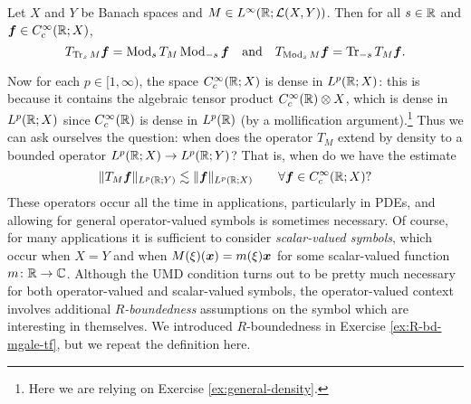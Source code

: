 \begin{prop}
  Let $X$ and $Y$ be Banach spaces and $M \in L^\infty(\mathbb{R};\mathcal{L}(X,Y))$.
  Then for all $s \in \mathbb{R}$ and $\bm{f} \in C^{\infty}_{c}(\mathbb{R};X)$,
  \begin{equation*}
    T_{\operatorname{Tr}_{s} M} \bm{f} = \operatorname{Mod}_{s} T_{M} \operatorname{Mod}_{-s} \bm{f} \quad \text{and} \quad
    T_{\operatorname{Mod}_{s} M} \bm{f} = \operatorname{Tr}_{-s} T_{M} \bm{f}. 
  \end{equation*}
\end{prop}

Now for each $p \in [1,\infty)$, the space $C_{c}^\infty(\mathbb{R};X)$ is dense in $L^p(\mathbb{R};X)$: this is because it contains the algebraic tensor product $C_{c}^\infty(\mathbb{R}) \otimes X$, which is dense in $L^p(\mathbb{R};X)$ since $C_{c}^\infty(\mathbb{R})$ is dense in $L^p(\mathbb{R})$ (by a mollification argument).\footnote{Here we are relying on Exercise \ref{ex:general-density}.}
Thus we can ask ourselves the question: when does the operator $T_{M}$ extend by density to a bounded operator $L^p(\mathbb{R};X) \to L^p(\mathbb{R};Y)$?
That is, when do we have the estimate
\begin{equation*}
  \|T_{M} \bm{f}\|_{L^p(\mathbb{R};Y)} \lesssim \|\bm{f}\|_{L^p(\mathbb{R};X)} \qquad \forall \bm{f} \in C_{c}^\infty(\mathbb{R};X)?
\end{equation*}
These operators occur all the time in applications, particularly in PDEs, and allowing for general operator-valued symbols is sometimes necessary.
Of course, for many applications it is sufficient to consider \emph{scalar-valued symbols}, which occur when $X = Y$ and when $M(\xi)(\bm{x}) = m(\xi)\bm{x}$ for some scalar-valued function $m \colon \mathbb{R} \rightarrow \mathbb{C}$.
Although the UMD condition turns out to be pretty much necessary for both operator-valued and scalar-valued symbols, the operator-valued context involves additional \emph{$R$-boundedness} assumptions on the symbol which are interesting in themselves.
We introduced $R$-boundedness in Exercise \ref{ex:R-bd-mgale-tf}, but we repeat the definition here. 

